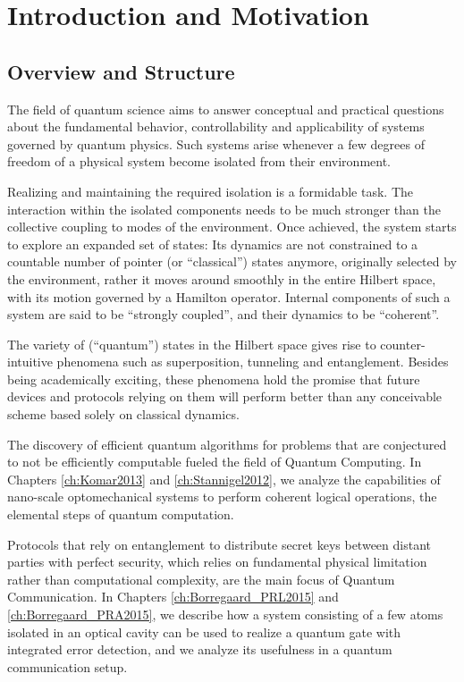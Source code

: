 \chapter{Introduction and Motivation}

\section{Overview and Structure}
The field of quantum science aims to answer conceptual and practical questions
about the fundamental behavior, controllability and applicability of 
systems governed by quantum physics. Such systems arise whenever a few 
degrees of freedom of a physical system become isolated from their environment. 

Realizing and maintaining the required isolation is a formidable
task. The interaction within the isolated components needs to be
much stronger than the collective coupling to modes of the environment.
Once achieved, the system starts to explore an expanded set of states: Its
dynamics are not constrained to a countable number of pointer (or
``classical'') states anymore, originally selected by the environment, rather it
moves around smoothly in the entire Hilbert space, with its motion governed by a
Hamilton operator. Internal components of such a system are said to be ``strongly
coupled'', and their dynamics to be ``coherent''.

The variety of (``quantum'') states in the Hilbert space  gives rise
to counter-intuitive phenomena such as superposition, tunneling and
entanglement.
Besides being academically exciting, these phenomena hold the promise that
future devices and protocols relying on them will perform better than any
conceivable scheme based solely on classical dynamics. 

The discovery of
efficient quantum algorithms for problems that are conjectured to not be
efficiently computable fueled the field of Quantum Computing. In Chapters
\ref{ch:Komar2013} and \ref{ch:Stannigel2012}, we analyze the
capabilities of nano-scale optomechanical systems to perform coherent logical
operations, the elemental steps of quantum computation.

Protocols that
rely on entanglement to distribute secret keys between distant parties with
perfect security, which relies on fundamental physical limitation rather than
computational complexity, are the main focus of Quantum Communication. In
Chapters \ref{ch:Borregaard_PRL2015} and \ref{ch:Borregaard_PRA2015}, we
describe how a system consisting of a few atoms isolated in an optical cavity can be used to realize a quantum gate with
integrated error detection, and we analyze its usefulness in a quantum
communication setup.

